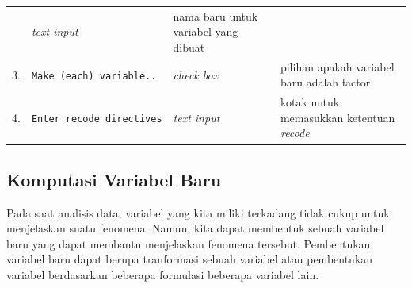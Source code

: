 \documentclass[12pt,]{krantz}
\begin{document}
\begin{longtable}[]{@{}llll@{}}
\begin{minipage}[t]{0.25\columnwidth}
\end{minipage} & \begin{minipage}[t]{0.15\columnwidth}\raggedright
\emph{text input}\strut
\end{minipage} & \begin{minipage}[t]{0.42\columnwidth}\raggedright
nama baru untuk variabel yang dibuat\strut
\end{minipage}\tabularnewline
\begin{minipage}[t]{0.07\columnwidth}\raggedright
3.\strut
\end{minipage} & \begin{minipage}[t]{0.25\columnwidth}\raggedright
\texttt{Make\ (each)\ variable..}\strut
\end{minipage} & \begin{minipage}[t]{0.15\columnwidth}\raggedright
\emph{check box}\strut
\end{minipage} & \begin{minipage}[t]{0.42\columnwidth}\raggedright
pilihan apakah variabel baru adalah factor\strut
\end{minipage}\tabularnewline
\begin{minipage}[t]{0.07\columnwidth}\raggedright
4.\strut
\end{minipage} & \begin{minipage}[t]{0.25\columnwidth}\raggedright
\texttt{Enter\ recode\ directives}\strut
\end{minipage} & \begin{minipage}[t]{0.15\columnwidth}\raggedright
\emph{text input}\strut
\end{minipage} & \begin{minipage}[t]{0.42\columnwidth}\raggedright
kotak untuk memasukkan ketentuan \emph{recode}\strut
\end{minipage}\tabularnewline
\bottomrule
\end{longtable}

\hypertarget{komputasi-variabel-baru}{%
\subsection{Komputasi Variabel Baru}\label{komputasi-variabel-baru}}

Pada saat analisis data, variabel yang kita miliki terkadang tidak cukup untuk menjelaskan suatu fenomena. Namun, kita dapat membentuk sebuah variabel baru yang dapat membantu menjelaskan fenomena tersebut. Pembentukan variabel baru dapat berupa tranformasi sebuah variabel atau pembentukan variabel berdasarkan beberapa formulasi beberapa variabel lain.
\end{document}
